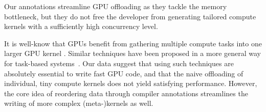 \begin{observation}
 Our annotations streamline GPU offloading as they tackle the memory bottleneck, but they do not free the developer from generating tailored compute kernels with a sufficiently high concurrency level. 
\end{observation}


\noindent
It is well-know that GPUs benefit from gathering multiple compute tasks into one larger GPU kernel \cite{Nasar:2024:GPU}.
Similar techniques have been proposed in a more general way for task-based systems~\cite{LiShultzWeinzierl:2022:Tasking}.
Our data suggest that using such techniques are absolutely essential to write fast GPU code, and that the naive offloading of individual, tiny compute kernels does not yield satisfying performance.
However, the core idea of reordering data through compiler annotations streamlines the writing of more complex (meta-)kernels as well.


